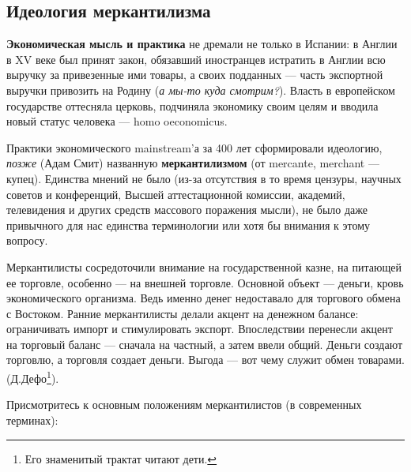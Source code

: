 \subsection[Идеология меркантилизма]{Идеология меркантилизма}
\textbf{Экономическая мысль и практика }не дремали не только в Испании: в Англии в \foreignlanguage{english}{XV} веке
был принят закон, обязавший иностранцев истратить в Англии всю выручку за привезенные ими товары, а своих подданных —
часть экспортной выручки привозить на Родину (\textit{а мы-то куда смотрим?}). Власть в европейском государстве
оттесняла церковь, подчиняла экономику своим целям и вводила новый статус человека — \foreignlanguage{english}{homo}
\foreignlanguage{english}{oeconomicus}.

Практики экономического \foreignlanguage{english}{mainstream}{}'а за 400 лет сформировали идеологию, \textit{позже}
(Адам Смит) названную \textbf{меркантилизмом} (от \foreignlanguage{english}{mercante},
\foreignlanguage{english}{merchant} — купец). Единства мнений не было (из-за отсутствия в то время цензуры, научных
советов и конференций, Высшей аттестационной комиссии, академий, телевидения и других средств массового поражения
мысли), не было даже привычного для нас единства терминологии или хотя бы внимания к этому вопросу.

Меркантилисты сосредоточили внимание на государственной казне, на питающей ее торговле, особенно — на внешней торговле.
Основной объект — деньги, кровь экономического организма. Ведь именно денег недоставало для торгового обмена с
Востоком. Ранние меркантилисты делали акцент на денежном балансе: ограничивать импорт и стимулировать экспорт.
Впоследствии перенесли акцент на торговый баланс — сначала на частный, а затем ввели общий. Деньги создают торговлю, а
торговля создает деньги. \flqq Выгода — вот чему служит обмен товарами\frqq.
(Д.Дефо\footnote{Его знаменитый трактат читают дети.}).

Присмотритесь к основным положениям меркантилистов (в современных терминах):


